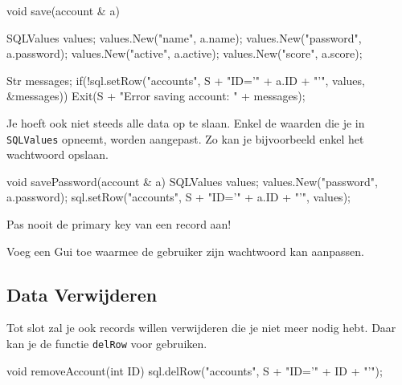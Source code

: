 \begin{code}
void save(account & a) {
  SQLValues values;
	values.New("name", a.name);
	values.New("password", a.password);
	values.New("active", a.active);
	values.New("score", a.score);
	
	Str messages;
	if(!sql.setRow("accounts", S + "ID='" + a.ID + "'", values, &messages)) {
	  Exit(S + "Error saving account: \n" + messages);
	}
}
\end{code}



Je hoeft ook niet steeds alle data op te slaan. Enkel de waarden die je in \texttt{SQLValues} opneemt, worden aangepast. Zo kan je bijvoorbeeld enkel het wachtwoord opslaan.

\begin{code}
void savePassword(account & a) {
  SQLValues values;
	values.New("password", a.password);
	sql.setRow("accounts", S + "ID='" + a.ID + "'", values);
}
\end{code}

\begin{note}
Pas nooit de primary key van een record aan!
\end{note}

\begin{exercise}
Voeg een Gui toe waarmee de gebruiker zijn wachtwoord kan aanpassen.
\end{exercise}

\subsection{Data Verwijderen}
Tot slot zal je ook records willen verwijderen die je niet meer nodig hebt. Daar kan je de functie \texttt{delRow} voor gebruiken. 

\begin{code}
void removeAccount(int ID) {
  sql.delRow("accounts", S + "ID='" + ID + "'");
}
\end{code}

